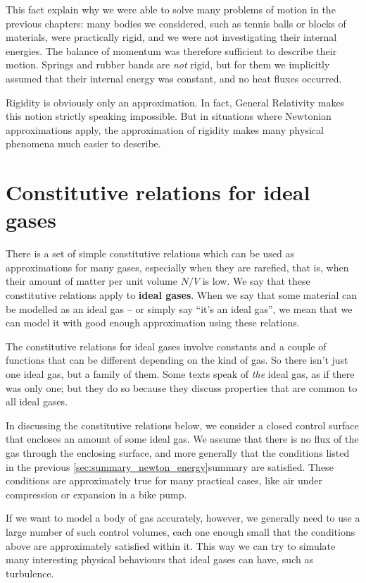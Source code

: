 \documentclass[a4paper,12pt,%
onecolumn,oneside,%
british%
]{memoir}
\renewcommand*{\|}[1][]{\nonscript\:#1\vert\nonscript\:\mathopen{}}
\newcommand*{\yN}{N}
\begin{document}
This fact explain why we were able to solve many problems of motion in the previous chapters: many bodies we considered, such as tennis balls or blocks of materials, were practically rigid, and we were not investigating their internal energies. The balance of momentum was therefore sufficient to describe their motion. Springs and rubber bands are \emph{not} rigid, but for them we implicitly assumed that their internal energy was constant, and no heat fluxes occurred.

\smallskip

Rigidity is obviously only an approximation. In fact, General Relativity makes this notion strictly speaking impossible. But in situations where Newtonian approximations apply, the approximation of rigidity makes many physical phenomena much easier to describe.

\section{Constitutive relations for ideal gases}
\label{sec:int_energy_idealgas}

There is a set of simple constitutive relations which can be used as approximations for many gases, especially when they are rarefied, that is, when their amount of matter per unit volume $\yN/V$ is low. We say that these constitutive relations apply to \textbf{ideal gases}. When we say that some material can be modelled as an ideal gas -- or simply say \enquote{it's an ideal gas}, we mean that we can model it with good enough approximation using these relations.

The constitutive relations for ideal gases involve constants and a couple of functions that can be different depending on the kind of gas. So there isn't just one ideal gas, but a family of them. Some texts speak of \emph{the} ideal gas, as if there was only one; but they do so because they discuss properties that are common to all ideal gases.

\smallskip

In discussing the constitutive relations below, we consider a closed control surface that encloses an amount of some ideal gas. We assume that there is no flux of the gas through the enclosing surface, and more generally that the conditions listed in the previous \ref{sec:summary_newton_energy}{summary} are satisfied. These conditions are approximately true for many practical cases, like air under compression or expansion in a bike pump.

If we want to model a body of gas accurately, however, we generally need to use a large number of such control volumes, each one enough small that the conditions above are approximately satisfied within it. This way we can try to simulate many interesting physical behaviours that ideal gases can have, such as turbulence.
\end{document}
